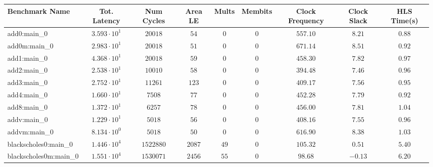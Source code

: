 \begin{tabular}{|l|c|c|c|c|c|c|c|c|}
\hline
Benchmark Name                 & Tot. Latency           & Num Cycles   & Area LE    & Mults    & Membits      & Clock Frequency & Clock Slack & HLS Time(s) \\
\hline
add0:main\_0                   & $ 3.593 \cdot 10^{1} $ & $ 20018    $ & $ 54     $ & $ 0    $ & $ 0        $ & $ 557.10      $ & $ 8.21    $ & $ 0.88    $ \\
add0m:main\_0                  & $ 2.983 \cdot 10^{1} $ & $ 20018    $ & $ 51     $ & $ 0    $ & $ 0        $ & $ 671.14      $ & $ 8.51    $ & $ 0.92    $ \\
add1:main\_0                   & $ 4.368 \cdot 10^{1} $ & $ 20018    $ & $ 59     $ & $ 0    $ & $ 0        $ & $ 458.30      $ & $ 7.82    $ & $ 0.97    $ \\
add2:main\_0                   & $ 2.538 \cdot 10^{1} $ & $ 10010    $ & $ 58     $ & $ 0    $ & $ 0        $ & $ 394.48      $ & $ 7.46    $ & $ 0.96    $ \\
add3:main\_0                   & $ 2.752 \cdot 10^{1} $ & $ 11261    $ & $ 123    $ & $ 0    $ & $ 0        $ & $ 409.17      $ & $ 7.56    $ & $ 0.95    $ \\
add4:main\_0                   & $ 1.660 \cdot 10^{1} $ & $ 7508     $ & $ 77     $ & $ 0    $ & $ 0        $ & $ 452.28      $ & $ 7.79    $ & $ 0.92    $ \\
add8:main\_0                   & $ 1.372 \cdot 10^{1} $ & $ 6257     $ & $ 78     $ & $ 0    $ & $ 0        $ & $ 456.00      $ & $ 7.81    $ & $ 1.04    $ \\
addv:main\_0                   & $ 1.229 \cdot 10^{1} $ & $ 5018     $ & $ 56     $ & $ 0    $ & $ 0        $ & $ 408.16      $ & $ 7.55    $ & $ 0.96    $ \\
addvm:main\_0                  & $ 8.134 \cdot 10^{0} $ & $ 5018     $ & $ 50     $ & $ 0    $ & $ 0        $ & $ 616.90      $ & $ 8.38    $ & $ 1.03    $ \\
blackscholes0:main\_0          & $ 1.446 \cdot 10^{4} $ & $ 1522880  $ & $ 2087   $ & $ 49   $ & $ 0        $ & $ 105.32      $ & $ 0.51    $ & $ 5.40    $ \\
blackscholes0m:main\_0         & $ 1.551 \cdot 10^{4} $ & $ 1530071  $ & $ 2456   $ & $ 55   $ & $ 0        $ & $ 98.68       $ & $ -0.13   $ & $ 6.20    $ \\

\end{tabular}
